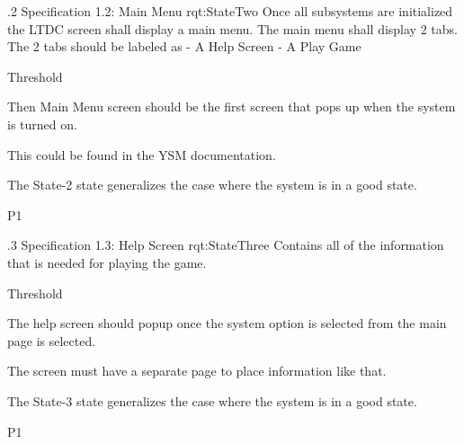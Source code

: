 \ONERQMTV
{\RqtNumberBase.2}
{Specification 1.2: Main Menu}
{rqt:StateTwo}
{	
	Once all subsystems are initialized the LTDC screen shall display a main menu. The main menu shall display 2 tabs. The 2 tabs should be labeled as
		- A Help Screen
		- A Play Game 
}
{
	\item [Phase 1] Threshold
}
{
	Then Main Menu screen should be the first screen that pops up when the system is turned on.
}
{
	\item [1] This could be found in the YSM documentation.
}
{
	\item The State-2 state generalizes the case where the system is in a good state.
}
{P1}


\ONERQMTV
{\RqtNumberBase.3}
{Specification 1.3: Help Screen}
{rqt:StateThree}
{
	Contains all of the information that is needed for playing the game.
}
{
	\item [Phase 1] Threshold
}
{
	The help screen should popup once the system option is selected from the main page is selected.
}
{
	\item [1] The screen must have a separate page to place information like that.
}
{
	\item The State-3 state generalizes the case where the system is in a good state.
}
{P1}

